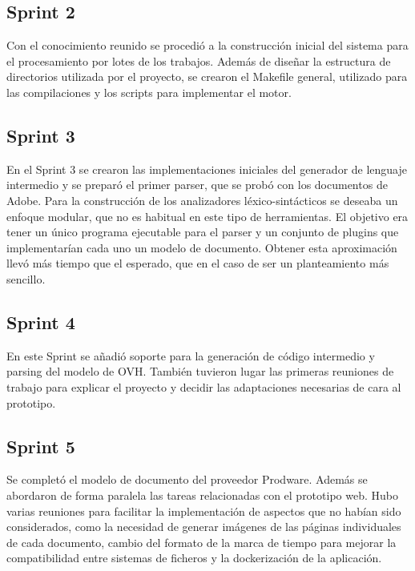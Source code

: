 \subsection{Sprint 2}

Con el conocimiento reunido se procedió a la construcción inicial del sistema para el procesamiento por lotes de los trabajos. Además de diseñar la estructura de directorios utilizada por el proyecto, se crearon el Makefile general, utilizado para las compilaciones y los scripts para implementar el motor.

\subsection{Sprint 3}

En el Sprint 3 se crearon las implementaciones iniciales del generador de lenguaje intermedio y se preparó el primer parser, que se probó con los documentos de Adobe. Para la construcción de los analizadores léxico-sintácticos se deseaba un enfoque modular, que no es habitual en este tipo de herramientas. El objetivo era tener un único programa ejecutable para el parser y un conjunto de plugins que implementarían cada uno un modelo de documento. Obtener esta aproximación llevó más tiempo que el esperado, que en el caso de ser un planteamiento más sencillo.

\subsection{Sprint 4}

En este Sprint se añadió soporte para la generación de código intermedio y parsing del modelo de OVH. También tuvieron lugar las primeras reuniones de trabajo para explicar el proyecto y decidir las adaptaciones necesarias de cara al prototipo.

\subsection{Sprint 5}

Se completó el modelo de documento del proveedor Prodware. Además se abordaron de forma paralela las tareas relacionadas con el prototipo web. Hubo varias reuniones para facilitar la implementación de aspectos que no habían sido considerados, como  la necesidad de generar imágenes de las páginas individuales de cada documento, cambio del formato de la marca de tiempo para mejorar la compatibilidad entre sistemas de ficheros y la dockerización de la aplicación.

